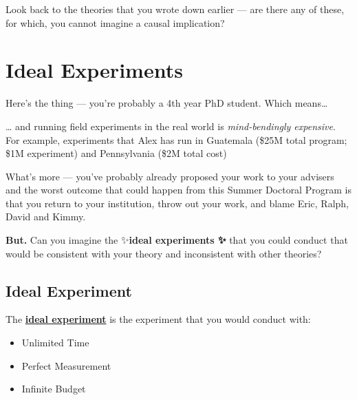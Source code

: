 \documentclass[
  letterpaper,
  DIV=11,
  numbers=noendperiod]{scrreprt}
\begin{document}
\begin{tcolorbox}[enhanced jigsaw, titlerule=0mm, colback=white, toptitle=1mm, toprule=.15mm, bottomtitle=1mm, colframe=quarto-callout-note-color-frame, colbacktitle=quarto-callout-note-color!10!white, bottomrule=.15mm, leftrule=.75mm, opacityback=0, title=\textcolor{quarto-callout-note-color}{\faInfo}\hspace{0.5em}{Discussion Question}, opacitybacktitle=0.6, arc=.35mm, rightrule=.15mm, breakable, coltitle=black, left=2mm]

Look back to the theories that you wrote down earlier --- are there any
of these, for which, you cannot imagine a causal implication?

\end{tcolorbox}


\chapter{Ideal Experiments}\label{ideal-experiments}

Here's the thing --- you're probably a 4th year PhD student. Which
means\ldots{} 💸 👻 🏦

\ldots{} and running field experiments in the real world is
\emph{mind-bendingly expensive}. For example, experiments that Alex has
run in Guatemala (\$25M total program; \$1M experiment) and Pennsylvania
(\$2M total cost)

What's more --- you've probably already proposed your work to your
advisers and the worst outcome that could happen from this Summer
Doctoral Program is that you return to your institution, throw out your
work, and blame Eric, Ralph, David and Kimmy.

\textbf{But.} Can you imagine the ✨\textbf{ideal experiments ✨} that
you could conduct that would be consistent with your theory and
inconsistent with other theories?

\section{Ideal Experiment}\label{ideal-experiment}

The
\href{https://media4.giphy.com/media/v1.Y2lkPTc5MGI3NjExOGxha21yNXV4djg5NXh5bG9uMHpnNmhoOGV1MWt3aXhnM2h3Y3BwMyZlcD12MV9pbnRlcm5hbF9naWZfYnlfaWQmY3Q9dg/RtFGrL8Fn2xutS0qmN/giphy.gif}{\textbf{ideal
experiment}} is the experiment that you would conduct with:

\begin{itemize}
\item
  Unlimited Time
\item
  Perfect Measurement
\item
  Infinite Budget
\end{itemize}
\end{document}
